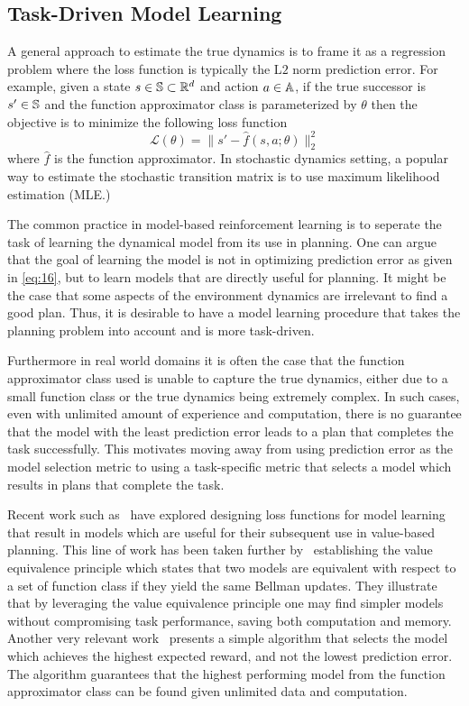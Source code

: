 \subsection{Task-Driven Model Learning}
\label{sec:task-driven-learning}

A general approach to estimate the true dynamics is to frame it as a
regression problem where the loss function is typically the L$2$ norm
prediction error. For example, given a state $s \in \mathbb{S}
\subset \mathbb{R}^d$
and action $a \in \mathbb{A}$,
if the true successor is $s' \in \mathbb{S}$ and the function
approximator class is parameterized by $\theta$ then the objective is
to minimize the following loss function
\begin{equation}
  \label{eq:16}
  \mathcal{L}(\theta) = \|s' - \hat{f}(s, a; \theta)\|_2^2
\end{equation}
where $\hat{f}$ is the function approximator. In stochastic dynamics
setting, a popular way to estimate the stochastic transition matrix is
to use maximum likelihood estimation (MLE.)

The common practice in model-based reinforcement learning is to
seperate the task of learning the dynamical model from its use in
planning. One can argue that the goal of learning the model is not in
optimizing prediction error as given in \eqref{eq:16}, but to learn
models that are directly useful for planning. It might be the case
that some aspects of the environment dynamics are irrelevant to find a
good plan. Thus, it is desirable to have a model learning procedure
that takes the planning problem into account and is more
task-driven.

Furthermore in real world domains it is often the case
that the function approximator class used is unable to capture the
true dynamics, either due to a small function class or the true
dynamics being extremely complex. In such cases, even with unlimited
amount of experience and computation, there is no guarantee that the
model with the least prediction error leads to a plan that completes
the task successfully. This motivates moving away from using
prediction error as the model selection metric to using a
task-specific metric that selects a model which results in plans that
complete the task.

Recent work such as~\cite{DBLP:conf/aistats/FarahmandBN17,
  Farahmand2018} have explored designing loss functions for model
learning that result in models which are useful for their subsequent
use in value-based planning. This line of work has been taken further
by~\cite{grimm2020value} establishing the value equivalence principle
which states that two models are equivalent with respect to a set of
function class if they yield the same Bellman updates. They illustrate
that by leveraging the value equivalence principle one may find
simpler models without compromising task performance, saving both
computation and memory. Another very relevant
work~\cite{DBLP:conf/icra/JosephGRHR13} presents a simple algorithm
that selects the model which achieves the highest expected reward, and
not the lowest prediction error. The algorithm guarantees that the
highest performing model from the function approximator class can be
found given unlimited data and computation.

